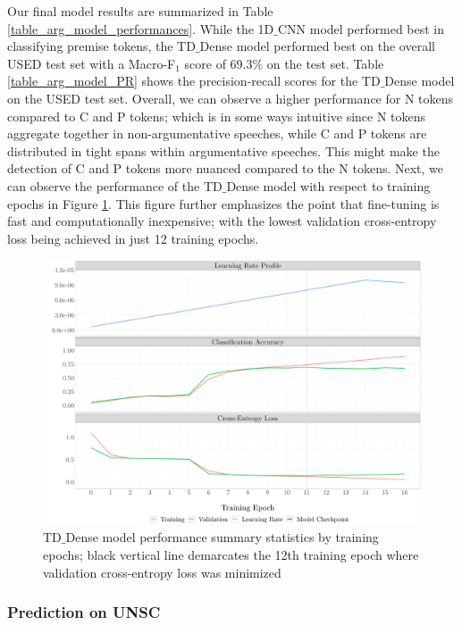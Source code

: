 Our final model results are summarized in Table \ref{table_arg_model_performances}. While the 1D$\_$CNN model performed best in classifying premise tokens, the TD$\_$Dense model performed best on the overall USED test set with a Macro-F$_1$ score of 69.3$\%$ on the test set. Table \ref{table_arg_model_PR} shows the precision-recall scores for the TD$\_$Dense model on the USED test set. Overall, we can observe a higher performance for N tokens compared to C and P tokens; which is in some ways intuitive since N tokens aggregate together in non-argumentative speeches, while C and P tokens are distributed in tight spans within argumentative speeches. This might make the detection of C and P tokens more nuanced compared to the N tokens. Next, we can observe the performance of the TD$\_$Dense model with respect to training epochs in Figure \ref{model_performance}. This figure further emphasizes the point that fine-tuning is fast and computationally inexpensive; with the lowest validation cross-entropy loss being achieved in just 12 training epochs.

\begin{figure}[t!]
    \centering
    \includegraphics[trim={1.0cm 0cm 0cm 0cm},clip,width=\textwidth]{img/model_training_evolution.pdf}
    \caption{TD$\_$Dense model performance summary statistics by training epochs; black vertical line demarcates the 12th training epoch where validation cross-entropy loss was minimized}
    \label{model_performance}
\end{figure}

\subsubsection{Prediction on UNSC}

